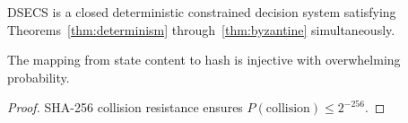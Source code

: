 \begin{corollary}
\label{cor:full}
DSECS is a closed deterministic constrained decision system satisfying Theorems~\ref{thm:determinism} through~\ref{thm:byzantine} simultaneously.
\end{corollary}

\begin{lemma}
\label{lem:hash}
The mapping from state content to hash is injective with overwhelming probability.
\end{lemma}

\begin{proof}
SHA-256 collision resistance ensures $P(\text{collision}) \leq 2^{-256}$. \end{proof}
